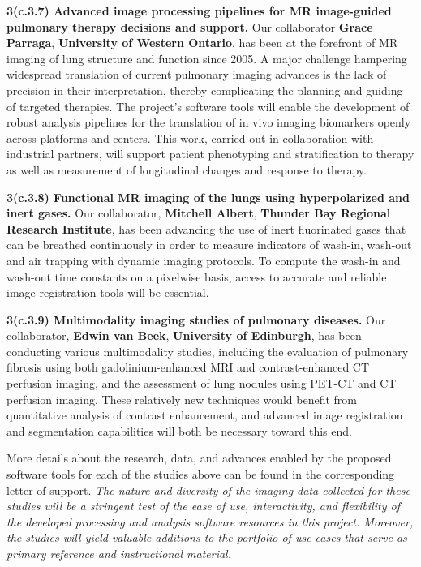 \documentclass[11pt,]{article}
\begin{document}
\textbf{3(c.3.7) Advanced image processing pipelines for MR image-guided
pulmonary therapy decisions and support.} Our collaborator \textbf{Grace
Parraga}, \textbf{University of Western Ontario}, has been at the
forefront of MR imaging of lung structure and function since 2005. A
major challenge hampering widespread translation of current pulmonary
imaging advances is the lack of precision in their interpretation,
thereby complicating the planning and guiding of targeted therapies. The
project's software tools will enable the development of robust analysis
pipelines for the translation of in vivo imaging biomarkers openly
across platforms and centers. This work, carried out in collaboration
with industrial partners, will support patient phenotyping and
stratification to therapy as well as measurement of longitudinal changes
and response to therapy.

\textbf{3(c.3.8) Functional MR imaging of the lungs using hyperpolarized
and inert gases.} Our collaborator, \textbf{Mitchell Albert},
\textbf{Thunder Bay Regional Research Institute}, has been advancing the
use of inert fluorinated gases that can be breathed continuously in
order to measure indicators of wash-in, wash-out and air trapping with
dynamic imaging protocols. To compute the wash-in and wash-out time
constants on a pixelwise basis, access to accurate and reliable image
registration tools will be essential.

\textbf{3(c.3.9) Multimodality imaging studies of pulmonary diseases.}
Our collaborator, \textbf{Edwin van Beek}, \textbf{University of
Edinburgh}, has been conducting various multimodality studies, including
the evaluation of pulmonary fibrosis using both gadolinium-enhanced MRI
and contrast-enhanced CT perfusion imaging, and the assessment of lung
nodules using PET-CT and CT perfusion imaging. These relatively new
techniques would benefit from quantitative analysis of contrast
enhancement, and advanced image registration and segmentation
capabilities will both be necessary toward this end.

More details about the research, data, and advances enabled by the
proposed software tools for each of the studies above can be found in
the corresponding letter of support. \emph{The nature and diversity of
the imaging data collected for these studies will be a stringent test of
the ease of use, interactivity, and flexibility of the developed
processing and analysis software resources in this project. Moreover,
the studies will yield valuable additions to the portfolio of use cases
that serve as primary reference and instructional material.}
\end{document}
